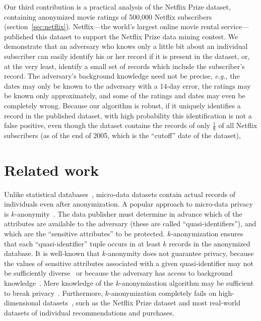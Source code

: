 \documentclass[11pt]{article}
\newcommand{\eg}{\emph{e.g.}}
\begin{document}

Our third contribution is a practical analysis of the Netflix Prize
dataset, containing anonymized movie ratings of 500,000 Netflix
subscribers (section~\ref{sec:netflix}).  Netflix---the world's largest
online movie rental service---published this dataset to support the
Netflix Prize data mining contest.  We demonstrate that an adversary who
knows only a little bit about an individual subscriber can easily identify
his or her record if it is present in the dataset, or, at the very least,
identify a small set of records which include the subscriber's record.
The adversary's background knowledge need not be precise, \eg, the dates
may only be known to the adversary with a 14-day error, the ratings may
be known only approximately, and some of the ratings and dates may even
be completely wrong.  Because our algorithm is robust, if it uniquely
identifies a record in the published dataset, with high probability
this identification is not a false positive, even though the dataset
contains the records of only $\frac{1}{8}$ of all Netflix subscribers
(as of the end of 2005, which is the ``cutoff'' date of the dataset),



\section{Related work}

Unlike statistical databases~\cite{TYW84,AW89,AS00,CDM05,sulq},
micro-data datasets contain actual records of individuals even
after anonymization.  A popular approach to micro-data privacy is
$k$-anonymity~\cite{ksweeney,sweeney-supp,ciriani}.  The data publisher
must determine in advance which of the attributes are available to the
adversary (these are called ``quasi-identifiers''), and which are the
``sensitive attributes'' to be protected.  $k$-anonymization ensures
that each ``quasi-identifier'' tuple occurs in at least $k$ records
in the anonymized database.  It is well-known that $k$-anonymity does
not guarantee privacy, because the values of sensitive attributes
associated with a given quasi-identifier may not be sufficiently
diverse~\cite{ldiversity,icde07} or because the adversary has
access to background knowledge~\cite{ldiversity}.  Mere knowledge
of the $k$-anonymization algorithm may be sufficient to break
privacy~\cite{leizhang}.  Furthermore, $k$-anonymization completely
fails on high-dimensional datasets~\cite{curse}, such as the Netflix
Prize dataset and most real-world datasets of individual recommendations
and purchases.
\end{document}
